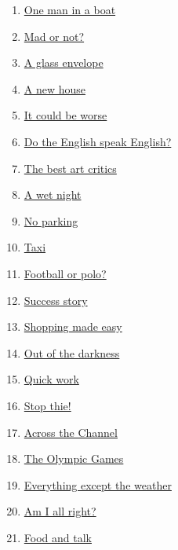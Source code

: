 \documentclass[11pt]{article}
\begin{document}
\begin{multicols}{2}
\begin{enumerate}
		\item \href{https://mp.weixin.qq.com/s/vuTDWgUdTEaE7o49DXYvnw}{One man in a boat}	%
		\item \href{https://mp.weixin.qq.com/s/5Wxa77RXBRR73EP5BrZCIQ}{Mad or not?}	%
		\item \href{https://mp.weixin.qq.com/s/50FDrx6UF7m50jEE9CEr8A}{A glass envelope}	%
		\item \href{https://mp.weixin.qq.com/s/_XZUZaarSGuAnlddW74nbg}{A new house}	%
		\item \href{https://mp.weixin.qq.com/s/mAIWR25K6kfkHJfqDpqqCA}{It could be worse}	%
		\item \href{https://mp.weixin.qq.com/s/wTmq50NgL_wV_eMabtmszw}{Do the English speak English?}	%
		\item \href{https://mp.weixin.qq.com/s/PfCVozEw7r6fhbaQsTXnzw}{The best art critics}	%
		\item \href{https://mp.weixin.qq.com/s/Nv0ZxZvi70PBz_Yh8V0Few}{A wet night}	%
		\item \href{https://mp.weixin.qq.com/s/cGR9q--qyjosjTrmWamoig}{No parking}	%
		\item \href{https://mp.weixin.qq.com/s/cO0TPWL5XylZ--mpOrOABg}{Taxi}	%
		\item \href{https://mp.weixin.qq.com/s/koqh-H-KMA5QDr_EdwgQSg}{Football or polo?}	%
		\item \href{https://mp.weixin.qq.com/s/o33v42P3ioXgkP5UPFKGOg}{Success story}	%
		\item \href{https://mp.weixin.qq.com/s/Q5WIdlBK8mIhAGivE785mQ}{Shopping made easy}	%
		\item \href{https://mp.weixin.qq.com/s/zta4OSWqMFNRXdxiHRRPZQ}{Out of the darkness}	%
		\item \href{https://mp.weixin.qq.com/s/jbPSz_DF9T1kI_ByignLEQ}{Quick work}	%
		\item \href{https://mp.weixin.qq.com/s/Q6m6AateAor64sBNT8Pe9Q}{Stop thie!}	%
		\item \href{https://mp.weixin.qq.com/s/Up76WjioOGb9FYz1mqpCqw}{Across the Channel}	%
		\item \href{https://mp.weixin.qq.com/s/X5fTd8_L4xZMpB6fSOMmHQ}{The Olympic Games}	%
		\item \href{https://mp.weixin.qq.com/s/0ZmPgJBpPe3gYuUuW5FMBg}{Everything except the weather}	%
		\item \href{https://mp.weixin.qq.com/s/_s9aZ_5S4Pm-VStnAE4O8Q}{Am I all right?}	%
		\item \href{https://mp.weixin.qq.com/s/mRHdO4tj0y9cbuk2yugYsw}{Food and talk}	%

\end{enumerate}
\end{multicols}
\end{document}

